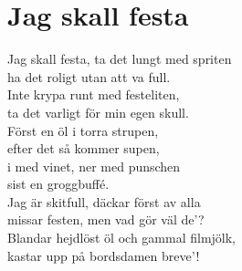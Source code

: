 \section{Jag skall festa}
Jag skall festa, ta det lungt med spriten\\
ha det roligt utan att va full.\\
Inte krypa runt med festeliten,\\
ta det varligt för min egen skull.\\

Först en öl i torra strupen,\\
efter det så kommer supen,\\
i med vinet, ner med punschen\\
sist en groggbuffé.\\

Jag är skitfull, däckar först av alla\\
missar festen, men vad gör väl de'?\\
Blandar hejdlöst öl och gammal filmjölk,\\
kastar upp på bordsdamen breve'!\\